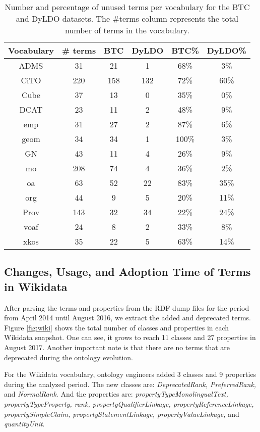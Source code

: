 \begin{table}
	\small
	\caption{Number and percentage of unused terms per vocabulary for the BTC and DyLDO datasets. The \#terms column represents the total number of terms in the vocabulary.}
	\label{table:table11}
	\begin{tabular}{cccccc}
		\toprule
		Vocabulary & \# terms & BTC & DyLDO & BTC\% & DyLDO\%\\
		\midrule 
		ADMS & 31 & 21 & 1 & 68\% & 3\%\\
		CiTO & 220 & 158 & 132 & 72\% & 60\%\\
		Cube & 37 & 13 & 0 & 35\% & 0\%\\
		DCAT & 23 & 11 & 2 & 48\% & 9\%\\
		emp & 31 & 27 & 2 & 87\% & 6\%\\
		geom & 34 & 34 & 1 & 100\% & 3\%\\
		GN & 43 & 11 & 4 & 26\% & 9\%\\
		mo & 208 & 74 & 4 & 36\% & 2\%\\
		oa & 63 & 52 & 22 & 83\% & 35\%\\ 
		org & 44 & 9 & 5 & 20\% & 11\%\\ 
		Prov & 143 & 32 & 34 & 22\% & 24\%\\ 
		voaf & 24 & 8 & 2 & 33\% & 8\%\\
		xkos & 35 & 22 & 5 & 63\% & 14\%\\
		\bottomrule
	\end{tabular}
\end{table} 

\subsection{Changes, Usage, and Adoption Time of Terms in Wikidata}
\label{wikiChanges}
After parsing the terms and properties from the RDF dump files for the period from April 2014 until August 2016, we extract the added and deprecated terms. Figure \ref{fig:wiki} shows the total number of classes and properties in each Wikidata snapshot. 
One can see, it grows to reach 11 classes and 27 properties in August 2017.
Another important note is that there are no terms that are deprecated during the ontology evolution.

For the Wikidata vocabulary, ontology engineers added 3 classes and 9 properties during the analyzed period. The new classes are: \textit{DeprecatedRank, PreferredRank,} and \textit{NormalRank}. And the properties are: \textit{propertyTypeMonolingualText, propertyTypeProperty, rank, propertyQualifierLinkage, propertyReferenceLinkage, propertySimpleClaim, propertyStatementLinkage, propertyValueLinkage,} and \textit{quantityUnit}.

